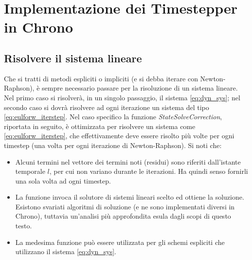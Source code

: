 \chapter{Implementazione dei Timestepper in Chrono}






\section{Risolvere il sistema lineare}
Che si tratti di metodi espliciti o impliciti (e si debba iterare con Newton-Raphson), è sempre necessario passare per la risoluzione di un sistema lineare.
Nel primo caso si risolverà, in un singolo passaggio, il sistema \ref{eq:dyn_sys}; nel secondo caso si dovrà risolvere ad ogni iterazione un sistema del tipo \ref{eq:eulforw_iterstep}.
Nel caso specifico la funzione \emph{StateSolveCorrection}, riportata in seguito, è ottimizzata per risolvere  un sistema come \ref{eq:eulforw_iterstep}, che effettivamente deve essere risolto più volte per ogni timestep (una volta per ogni iterazione di Newton-Raphson). Si noti che:
\begin{itemize}
    \item Alcuni termini nel vettore dei termini noti (residui) sono riferiti dall'istante temporale $l$, per cui non variano durante le iterazioni. Ha quindi senso fornirli una sola volta ad ogni timestep.
    \item La funzione invoca  il solutore di sistemi lineari scelto ed ottiene la soluzione. Esistono svariati algoritmi di soluzione (e ne sono implementati diversi in Chrono), tuttavia un'analisi più approfondita esula dagli scopi di questo testo.
    \item La medesima funzione può essere utilizzata per gli schemi espliciti che utilizzano il sistema \ref{eq:dyn_sys}.
\end{itemize}

